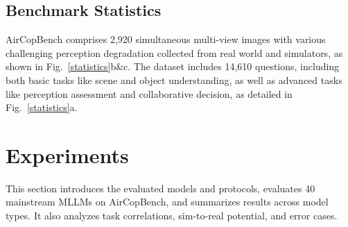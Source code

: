\documentclass[letterpaper]{article} %
\begin{document}




\subsection{Benchmark Statistics} 
AirCopBench comprises 2,920 simultaneous multi-view images with various challenging perception degradation collected from real world and simulators, as shown in Fig.~\ref{statistics}b\&c. The dataset includes 14,610 questions, including both basic tasks like scene and object understanding, as well as advanced tasks like perception assessment and collaborative decision, as detailed in Fig.~\ref{statistics}a. 


\section{Experiments}
This section introduces the evaluated models and protocols, evaluates 40 mainstream MLLMs on AirCopBench, and summarizes results across model types. It also analyzes task correlations, sim-to-real potential, and error cases.
\end{document}
